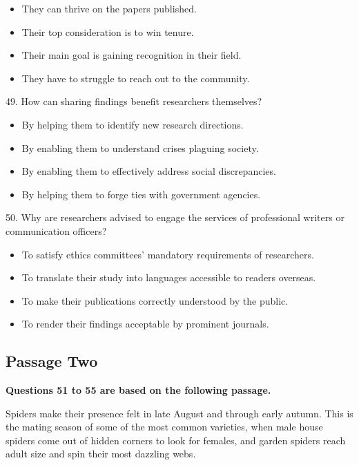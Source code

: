 \documentclass[UTF8,11pt]{ctexart}
\begin{document}
\begin{itemize}[leftmargin=2em,itemsep=.2em,topsep=.4em]\item[A.] They can thrive on the papers published.
\item[B.] Their top consideration is to win tenure.
\item[C.] Their main goal is gaining recognition in their field.
\item[D.] They have to struggle to reach out to the community.
\end{itemize}

49. How can sharing findings benefit researchers themselves?


\begin{itemize}[leftmargin=2em,itemsep=.2em,topsep=.4em]\item[A.] By helping them to identify new research directions.
\item[B.] By enabling them to understand crises plaguing society.
\item[C.] By enabling them to effectively address social discrepancies.
\item[D.] By helping them to forge ties with government agencies.
\end{itemize}

50. Why are researchers advised to engage the services of professional writers or communication officers?


\begin{itemize}[leftmargin=2em,itemsep=.2em,topsep=.4em]\item[A.] To satisfy ethics committees’ mandatory requirements of researchers.
\item[B.] To translate their study into languages accessible to readers overseas.
\item[C.] To make their publications correctly understood by the public.
\item[D.] To render their findings acceptable by prominent journals.
\end{itemize}

\subsection*{\textbf{Passage Two}}


\textbf{Questions 51 to 55 are based on the following passage.}


Spiders make their presence felt in late August and through early autumn. This is the mating season of some of the most common varieties, when male house spiders come out of hidden corners to look for females, and garden spiders reach adult size and spin their most dazzling webs.
\end{document}
